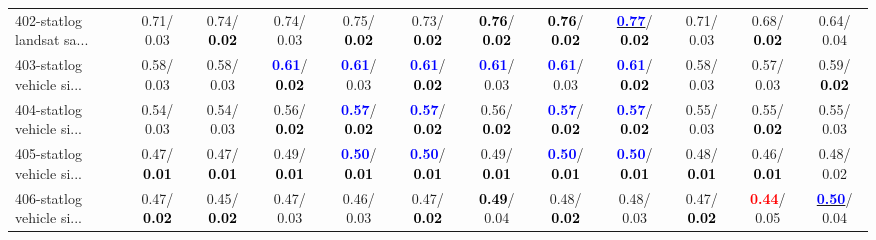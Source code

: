 \begin{table}[h]
\begin{center}
{\begin{tabular}{lc|c|c|c|c|c|c|c|c|c|c}
402-statlog landsat sa... &   0.71/  0.03 &   0.74/\textcolor{black}{\textbf{  0.02}} &   0.74/  0.03 &   0.75/\textcolor{black}{\textbf{  0.02}} &   0.73/\textcolor{black}{\textbf{  0.02}} & \textcolor{black}{\textbf{  0.76}}/\textcolor{black}{\textbf{  0.02}} & \textcolor{black}{\textbf{  0.76}}/\textcolor{black}{\textbf{  0.02}} & \underline{\textcolor{blue}{\textbf{  0.77}}}/\textcolor{black}{\textbf{  0.02}} &   0.71/  0.03 &   0.68/\textcolor{black}{\textbf{  0.02}} &   0.64/  0.04 \\
403-statlog vehicle si... &   0.58/  0.03 &   0.58/  0.03 & \textcolor{blue}{\textbf{  0.61}}/\textcolor{black}{\textbf{  0.02}} & \textcolor{blue}{\textbf{  0.61}}/  0.03 & \textcolor{blue}{\textbf{  0.61}}/\textcolor{black}{\textbf{  0.02}} & \textcolor{blue}{\textbf{  0.61}}/  0.03 & \textcolor{blue}{\textbf{  0.61}}/  0.03 & \textcolor{blue}{\textbf{  0.61}}/\textcolor{black}{\textbf{  0.02}} &   0.58/  0.03 &   0.57/  0.03 &   0.59/\textcolor{black}{\textbf{  0.02}} \\
404-statlog vehicle si... &   0.54/  0.03 &   0.54/  0.03 &   0.56/\textcolor{black}{\textbf{  0.02}} & \textcolor{blue}{\textbf{  0.57}}/\textcolor{black}{\textbf{  0.02}} & \textcolor{blue}{\textbf{  0.57}}/\textcolor{black}{\textbf{  0.02}} &   0.56/\textcolor{black}{\textbf{  0.02}} & \textcolor{blue}{\textbf{  0.57}}/\textcolor{black}{\textbf{  0.02}} & \textcolor{blue}{\textbf{  0.57}}/\textcolor{black}{\textbf{  0.02}} &   0.55/  0.03 &   0.55/\textcolor{black}{\textbf{  0.02}} &   0.55/  0.03 \\
405-statlog vehicle si... &   0.47/\textcolor{black}{\textbf{  0.01}} &   0.47/\textcolor{black}{\textbf{  0.01}} &   0.49/\textcolor{black}{\textbf{  0.01}} & \textcolor{blue}{\textbf{  0.50}}/\textcolor{black}{\textbf{  0.01}} & \textcolor{blue}{\textbf{  0.50}}/\textcolor{black}{\textbf{  0.01}} &   0.49/\textcolor{black}{\textbf{  0.01}} & \textcolor{blue}{\textbf{  0.50}}/\textcolor{black}{\textbf{  0.01}} & \textcolor{blue}{\textbf{  0.50}}/\textcolor{black}{\textbf{  0.01}} &   0.48/\textcolor{black}{\textbf{  0.01}} &   0.46/\textcolor{black}{\textbf{  0.01}} &   0.48/  0.02 \\ \hline
406-statlog vehicle si... &   0.47/\textcolor{black}{\textbf{  0.02}} &   0.45/\textcolor{black}{\textbf{  0.02}} &   0.47/  0.03 &   0.46/  0.03 &   0.47/\textcolor{black}{\textbf{  0.02}} & \textcolor{black}{\textbf{  0.49}}/  0.04 &   0.48/\textcolor{black}{\textbf{  0.02}} &   0.48/  0.03 &   0.47/\textcolor{black}{\textbf{  0.02}} & \textcolor{red}{\textbf{  0.44}}/  0.05 & \underline{\textcolor{blue}{\textbf{  0.50}}}/  0.04 \\

\end{tabular}}
\end{center}
\end{table}
